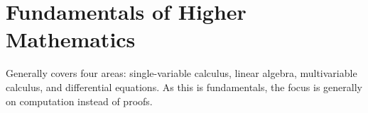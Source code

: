 \section{Fundamentals of Higher Mathematics}

Generally covers four areas: single-variable calculus, linear algebra, multivariable calculus, and differential equations. As this is fundamentals, the focus is generally on computation instead of proofs.




